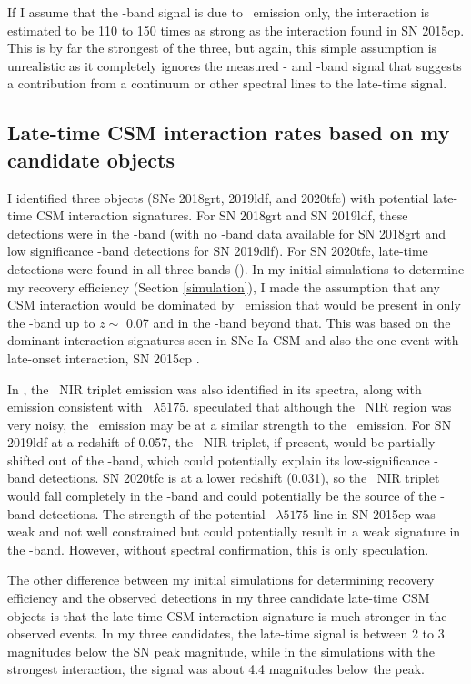 \documentclass[a4paper,oneside,12pt, class=Latex/Classes/PhDthesisPSnPDF, crop=false]{standalone}
\begin{document}
If I assume that the \ztfr-band signal is due to \Halpha~emission only, the interaction is estimated to be 110 to 150 times as strong as the interaction found in SN 2015cp. This is by far the strongest of the three, but again, this simple assumption is unrealistic as it completely ignores the measured \ztfg- and \ztfi-band signal that suggests a contribution from a continuum or other spectral lines to the late-time signal.


\subsection{Late-time CSM interaction rates based on my candidate objects}
\label{rates_csm}
I identified three objects (SNe 2018grt, 2019ldf, and 2020tfc) with potential late-time CSM interaction signatures. For SN 2018grt and SN 2019ldf, these detections were in the \ztfr-band (with no \ztfi-band data available for SN 2018grt and low significance \ztfi-band detections for SN 2019dlf). For SN 2020tfc, late-time detections were found in all three bands (\ztfg\ztfr\ztfi). In my initial simulations to determine my recovery efficiency (Section \ref{simulation}), I made the assumption that any CSM interaction would be dominated by \Halpha~emission that would be present in only the \ztfr-band up to $z \sim$ 0.07 and in the \ztfi-band beyond that. This was based on the dominant interaction signatures seen in SNe Ia-CSM and also the one event with late-onset interaction, SN 2015cp \citep{2015cp}.

In \citet{2015cp}, the \CaII\ NIR triplet emission was also identified in its spectra, along with emission consistent with \MgI~$\lambda5175$. \cite{2015cp_radio} speculated that although the \CaII\ NIR region was very noisy, the \CaII\ emission may be at a similar strength to the \Halpha~emission. For SN 2019ldf at a redshift of 0.057, the \CaII\ NIR triplet, if present, would be partially shifted out of the \ztfi-band, which could potentially explain its low-significance \ztfi-band detections. SN 2020tfc is at a lower redshift (0.031), so the \CaII\ NIR triplet would fall completely in the \ztfi-band and could potentially be the source of the \ztfi-band detections. The strength of the potential \MgI~$\lambda5175$ line in SN 2015cp was weak and not well constrained \citep{2015cp} but could potentially result in a weak signature in the \ztfg-band. However, without spectral confirmation, this is only speculation.

The other difference between my initial simulations for determining recovery efficiency and the observed detections in my three candidate late-time CSM objects is that the late-time CSM interaction signature is much stronger in the observed events. In my three candidates, the late-time signal is between 2 to 3 magnitudes below the SN peak magnitude, while in the simulations with the strongest interaction, the signal was about 4.4 magnitudes below the peak.
\end{document}

